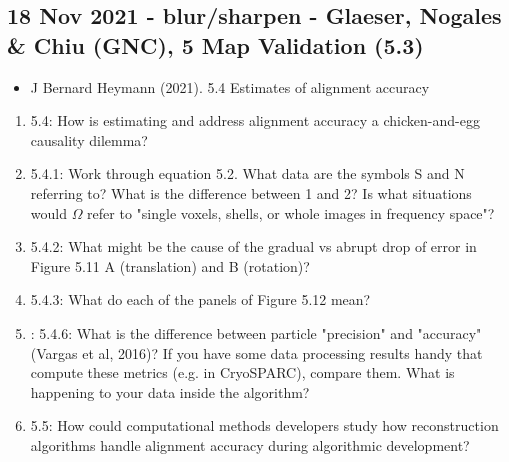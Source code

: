 \documentclass[11pt, oneside]{article}   	%
\begin{document}
\subsection{18 Nov 2021 - blur/sharpen - Glaeser, Nogales \& Chiu (GNC), 5 Map Validation (5.3)}

\begin{itemize}
	\item J Bernard Heymann (2021). 5.4 Estimates of alignment accuracy
\end{itemize}
\begin{enumerate}
	\item 5.4: How is estimating and address alignment accuracy a chicken-and-egg causality dilemma?
	\item 5.4.1: Work through equation 5.2. What data are the symbols S and N referring to? What is the difference between 1 and 2? Is what situations would $\Omega$ refer to "single voxels, shells, or whole images in frequency space"?
	\item 5.4.2: What might be the cause of the gradual vs abrupt drop of error in Figure 5.11 A (translation) and B (rotation)?
	\item 5.4.3: What do each of the panels of Figure 5.12 mean?
	\item: 5.4.6: What is the difference between particle "precision" and "accuracy" (Vargas et al, 2016)? If you have some data processing results handy that compute these metrics (e.g. in CryoSPARC), compare them. What is happening to your data inside the algorithm? 
	\item 5.5: How could computational methods developers study how reconstruction algorithms handle alignment accuracy during algorithmic development?
\end{enumerate}


\end{document}
